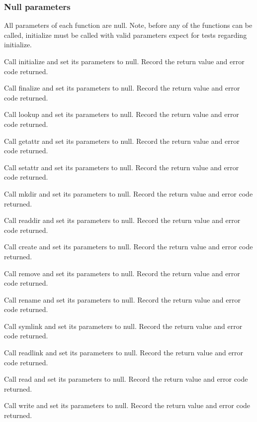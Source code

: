 \documentclass[12pt]{article} %
\begin{document}
\subsubsection{Null parameters}
\label{null1L}
All parameters of each function are null. Note, before any of the functions can be called, initialize must be called with valid parameters expect for tests regarding
initialize.

\begin{list}{.}{}
\item Call initialize and set its parameters to null.  Record the return value and error code returned.
\item Call finalize and set its parameters to null.  Record the return value and error code returned.
\item Call lookup and set its parameters to null.  Record the return value and error code returned.
\item Call getattr and set its parameters to null.  Record the return value and error code returned.
\item Call setattr and set its parameters to null.  Record the return value and error code returned.
\item Call mkdir and set its parameters to null.  Record the return value and error code returned.
\item Call readdir and set its parameters to null.  Record the return value and error code returned.
\item Call create and set its parameters to null.  Record the return value and error code returned.
\item Call remove and set its parameters to null.  Record the return value and error code returned.
\item Call rename and set its parameters to null.  Record the return value and error code returned.
\item Call symlink and set its parameters to null.  Record the return value and error code returned.
\item Call readlink and set its parameters to null.  Record the return value and error code returned.
\item Call read and set its parameters to null.  Record the return value and error code returned.
\item Call write and set its parameters to null.  Record the return value and error code returned.
\end{list}


\end{document}
